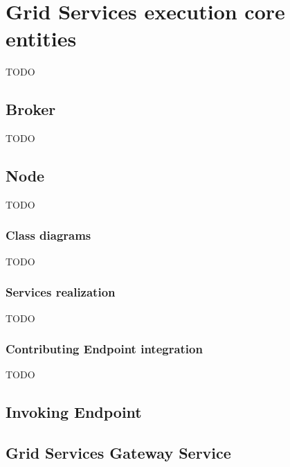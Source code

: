 \section{Grid Services execution core entities}
TODO

\subsection{Broker}
TODO

\subsection{Node}
TODO

\subsubsection{Class diagrams}
TODO

\subsubsection{Services realization}
TODO

\subsubsection{Contributing Endpoint integration}
TODO

\subsection{Invoking Endpoint}

\subsection{Grid Services Gateway Service}
